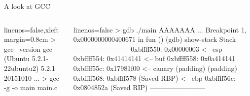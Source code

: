 \documentclass[beamer]{uibk}
\begin{document}
\begin{frame}[fragile]{A look at GCC}
    \begin{columns}
        \begin{column}{0.5\textwidth}
            \begin{code*}{linenos=false,xleftmargin=0.8cm}
                > gcc --version
                gcc (Ubuntu 5.2.1-22ubuntu2) 5.2.1 20151010
                  ...
                > gcc -g -o main main.c
            \end{code*}
        \end{column}
        \pause
        \begin{column}{0.5\textwidth}
            \begin{code*}{linenos=false}
                > gdb ./main
                AAAAAAA
                  ...
                Breakpoint 1, 0x0000000000400671 in fun ()
                (gdb) show-stack
                Stack
                ------------------------
                0xbffff550: 0x00000003             <-- esp
                0xbffff554: 0x41414141             <-- buf
                0xbffff558: 0x0a414141
                0xbffff55c: 0x17981f00             <-- canary
                       (padding)
                       (padding)
                0xbffff568: 0xbffff578 (Saved RBP) <-- ebp
                0xbffff56c: 0x0804852a (Saved RIP)
                ------------------------
            \end{code*}
        \end{column}
    \end{columns}
\end{frame}
\end{document}
